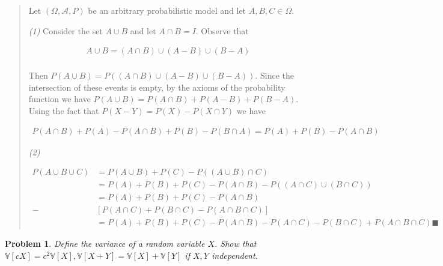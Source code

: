 \documentclass[a4paper, 12pt]{article}
\newtheorem{problem}{Problem}
\newtheorem{problem}{Problem}
\begin{document}
\small
\begin{quote}


Let $(\Omega, \mathcal{A}, P)$ be an arbitrary probabilistic model and let $A,
B, C \in \Omega$. 

\textit{(1)} Consider the set $A \cup B$ and let $A \cap B = I$. Observe that

\begin{align*}
    A \cup B = (A \cap B) \cup (A - B) \cup (B - A) \\ 
\end{align*}

Then $P(A \cup B) = P \left( (A \cap B) \cup (A - B) \cup (B-A) \right) $. Since
the intersection of these events is empty, by the axioms of the probability
function we have $P(A \cup B) = P(A \cap B) + P(A - B) + P(B - A)$. Using the
fact that $P(X - Y) = P(X) - P(X \cap Y)$ we have 

\begin{align*}
    P(A \cap B) + P(A) - P(A \cap B) + P(B) - P(B \cap A) = P(A) + P(B) - P(A
    \cap B)
\end{align*}

\textit{(2)}  

\begin{align*}
    P(A \cup B \cup C) &= P(A \cup B) + P(C) - P\left( (A \cup B) \cap C
    \right)\\ 
                       &=P(A) + P(B) + P(C) - P(A \cap B) - P\left( (A \cap C)
                       \cup (B \cap C) \right) \\ 
                       &=P(A) + P(B) + P(C) - P(A \cap B)\\ 
        -&\left[ P(A \cap C) + P(B \cap C) - P(A \cap B \cap C) \right]  \\ 
         &=P(A) + P(B) + P(C) - P(A \cap B) - P(A \cap C) - P(B \cap C) + P(A
         \cap B \cap C) \blacksquare
\end{align*}


\end{quote}
\normalsize

\pagebreak 

\begin{problem}
    Define the variance of a random variable $X$. Show that $\mathbb{V}\left[ cX
    \right] = c^2 \mathbb{V}\left[ X \right], \mathbb{V}\left[ X + Y \right] =
    \mathbb{V}[X] + \mathbb{V}\left[ Y \right]   $ if $X, Y$ independent.
\end{problem}
\end{document}
